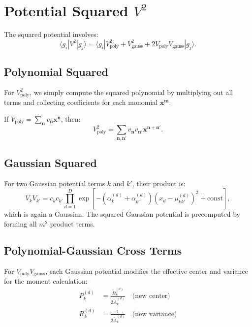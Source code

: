 \documentclass[11pt,a4paper]{article}
\theoremstyle{definition}
\begin{document}
\section{Potential Squared $V^2$}

The squared potential involves:
\begin{equation}
\langle g_i | V^2 | g_j \rangle = \langle g_i | V_{\text{poly}}^2 + V_{\text{gauss}}^2 + 2 V_{\text{poly}} V_{\text{gauss}} | g_j \rangle.
\end{equation}

\subsection{Polynomial Squared}

For $V_{\text{poly}}^2$, we simply compute the squared polynomial by multiplying out all terms and collecting coefficients for each monomial $\bm{x}^{\bm{m}}$.

If $V_{\text{poly}} = \sum_{\bm{n}} v_{\bm{n}} \bm{x}^{\bm{n}}$, then:
\begin{equation}
V_{\text{poly}}^2 = \sum_{\bm{n}, \bm{n}'} v_{\bm{n}} v_{\bm{n}'} \bm{x}^{\bm{n} + \bm{n}'}.
\end{equation}

\subsection{Gaussian Squared}

For two Gaussian potential terms $k$ and $k'$, their product is:
\begin{equation}
V_k V_{k'} = c_k c_{k'} \prod_{d=1}^D \exp\left[ -(\alpha_k^{(d)} + \alpha_{k'}^{(d)})(x_d - \mu_{kk'}^{(d)})^2 + \text{const} \right],
\end{equation}
which is again a Gaussian. The squared Gaussian potential is precomputed by forming all $m^2$ product terms.

\subsection{Polynomial-Gaussian Cross Terms}

For $V_{\text{poly}} V_{\text{gauss}}$, each Gaussian potential modifies the effective center and variance for the moment calculation:
\begin{align}
P_k^{(d)} &= \frac{\tilde{B}_k^{(d)}}{2\tilde{A}_k^{(d)}} \quad \text{(new center)} \\
R_k^{(d)} &= \frac{1}{2\tilde{A}_k^{(d)}} \quad \text{(new variance)}
\end{align}
\end{document}
